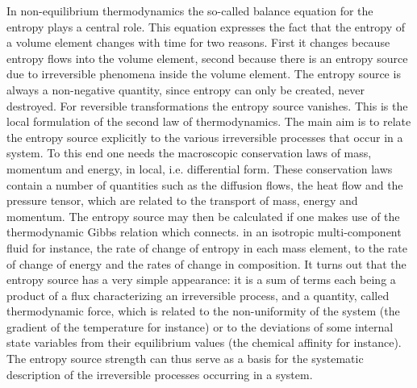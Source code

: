 In non-equilibrium thermodynamics the so-called balance equation for the entropy plays a central role. This equation expresses the fact that the entropy of a volume element changes with time for two reasons. First it changes because entropy flows into the volume element, second because there is an entropy source due to irreversible phenomena inside the volume element. The entropy source is always a non-negative quantity, since entropy can only be created, never destroyed. For reversible transformations the entropy source vanishes. This is the local formulation of the second law of thermodynamics. The main aim is to relate the entropy source explicitly to the various irreversible processes that occur in a system. To this end one needs the macroscopic conservation laws of mass, momentum and energy, in local, i.e. differential form. These conservation laws contain a number of quantities such as the diffusion flows, the heat flow and the pressure tensor, which are related to the transport of mass, energy and momentum. The entropy source may then be calculated if one makes use of the thermodynamic Gibbs relation which connects. in an isotropic multi-component fluid for instance, the rate of change of entropy in each mass element, to the rate of change of energy and the rates of change in composition. It turns out that the entropy source has a very simple appearance: it is a sum of terms each being a product of a flux characterizing an irreversible process, and a quantity, called thermodynamic force, which is related to the non-uniformity of the system (the gradient of the temperature for instance) or to the deviations of some internal state variables from their equilibrium values (the chemical affinity for instance). The entropy source strength can thus serve as a basis for the systematic description of the irreversible processes occurring in a system.

